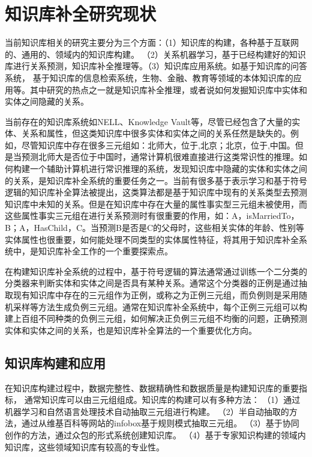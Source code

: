 

\chapter{知识库补全研究现状}
\label{cha:related-work}

当前知识库相关的研究主要分为三个方面：（1）知识库的构建，各种基于互联网的、通用的、领域内的知识库构建。
（2）关系机器学习，基于已经构建好的知识库进行关系预测，知识库补全推理等。（3）知识库应用系统。如基于知识库的问答系统，
基于知识库的信息检索系统，生物、金融、教育等领域的本体知识库的应用等。其中研究的热点之一就是知识库补全推理，或者说如何发掘知识库中实体和实体之间隐藏的关系。

当前存在的知识库系统如NELL、Knowledge Vault等，尽管已经包含了大量的实体、关系和属性，但这类知识库中很多实体和实体之间的关系任然是缺失的。例如，尽管知识库中存在很多三元组如：北师大，位于,北京；北京，位于,中国。但是当预测北师大是否位于中国时，通常计算机很难直接进行这类常识性的推理。如何构建一个辅助计算机进行常识推理的系统，发现知识库中隐藏的实体和实体之间的关系，是知识库补全系统的重要任务之一。当前有很多基于表示学习和基于符号逻辑的知识库补全算法被提出，这类算法都是基于知识库中现有的关系类型去预测知识库中未知的关系。但是在知识库中存在大量的属性事实型三元组未被使用，而这些属性事实三元组在进行关系预测时有很重要的作用，如：A，isMarriedTo，B；A，HasChild，C。当预测B是否是C的父母时，这些相关实体的年龄、性别等实体属性也很重要，如何能处理不同类型的实体属性特征，将其用于知识库补全系统中，是知识库补全工作的一个重要探索点。

在构建知识库补全系统的过程中，基于符号逻辑的算法通常通过训练一个二分类的分类器来判断实体和实体之间是否具有某种关系。通常这个分类器的正例是通过抽取现有知识库中存在的三元组作为正例，或称之为正例三元组，而负例则是采用随机采样等方法生成负例三元组。通常在知识库补全系统中，每个正例三元组可以构建上百组不同种类的负例三元组，如何解决正负例三元组不均衡的问题，正确预测实体和实体之间的关系，也是知识库补全算法的一个重要优化方向。

\section{知识库构建和应用}
在知识库构建过程中，数据完整性、数据精确性和数据质量是构建知识库的重要指标，
通常知识库可以由三元组组成。知识库的构建可以有多种方法：
（1）通过机器学习和自然语言处理技术自动抽取三元组\cite{Weikum2010FromIT}进行构建。
（2）半自动抽取的方法，通过从维基百科等网站的infobox基于规则模式抽取三元组。
（3）基于协同创作\cite{Mitraka2015WikidataAP}的方法，通过众包的形式系统创建知识库。
（4）基于专家知识构建的领域内知识库，这些领域知识库有较高的专业性。

